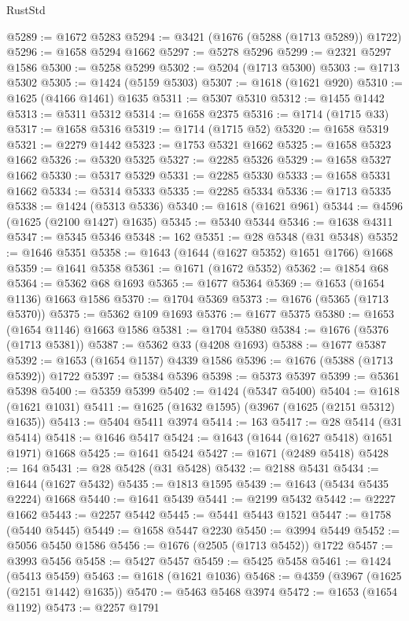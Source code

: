 \begin{lexlean}{RustStd}
\begin{coremodule}
@5289 := @1672 @5283
@5294 := @3421 (@1676 (@5288 (@1713 @5289)) @1722)
@5296 := @1658 @5294 @1662
@5297 := @5278 @5296
@5299 := @2321 @5297 @1586
@5300 := @5258 @5299
@5302 := @5204 (@1713 @5300)
@5303 := @1713 @5302
@5305 := @1424 (@5159 @5303)
@5307 := @1618 (@1621 @920)
@5310 := @1625 (@4166 @1461) @1635
@5311 := @5307 @5310
@5312 := @1455 @1442
@5313 := @5311 @5312
@5314 := @1658 @2375
@5316 := @1714 (@1715 @33)
@5317 := @1658 @5316
@5319 := @1714 (@1715 @52)
@5320 := @1658 @5319
@5321 := @2279 @1442
@5323 := @1753 @5321 @1662
@5325 := @1658 @5323 @1662
@5326 := @5320 @5325
@5327 := @2285 @5326
@5329 := @1658 @5327 @1662
@5330 := @5317 @5329
@5331 := @2285 @5330
@5333 := @1658 @5331 @1662
@5334 := @5314 @5333
@5335 := @2285 @5334
@5336 := @1713 @5335
@5338 := @1424 (@5313 @5336)
@5340 := @1618 (@1621 @961)
@5344 := @4596 (@1625 (@2100 @1427) @1635)
@5345 := @5340 @5344
@5346 := @1638 @4311
@5347 := @5345 @5346
@5348 := 162
@5351 := @28 @5348 (@31 @5348)
@5352 := @1646 @5351
@5358 := @1643 (@1644 (@1627 @5352) @1651 @1766) @1668
@5359 := @1641 @5358
@5361 := @1671 (@1672 @5352)
@5362 := @1854 @68
@5364 := @5362 @68 @1693
@5365 := @1677 @5364
@5369 := @1653 (@1654 @1136) @1663 @1586
@5370 := @1704 @5369
@5373 := @1676 (@5365 (@1713 @5370))
@5375 := @5362 @109 @1693
@5376 := @1677 @5375
@5380 := @1653 (@1654 @1146) @1663 @1586
@5381 := @1704 @5380
@5384 := @1676 (@5376 (@1713 @5381))
@5387 := @5362 @33 (@4208 @1693)
@5388 := @1677 @5387
@5392 := @1653 (@1654 @1157) @4339 @1586
@5396 := @1676 (@5388 (@1713 @5392)) @1722
@5397 := @5384 @5396
@5398 := @5373 @5397
@5399 := @5361 @5398
@5400 := @5359 @5399
@5402 := @1424 (@5347 @5400)
@5404 := @1618 (@1621 @1031)
@5411 := @1625 (@1632 @1595) (@3967 (@1625 (@2151 @5312) @1635))
@5413 := @5404 @5411 @3974
@5414 := 163
@5417 := @28 @5414 (@31 @5414)
@5418 := @1646 @5417
@5424 := @1643 (@1644 (@1627 @5418) @1651 @1971) @1668
@5425 := @1641 @5424
@5427 := @1671 (@2489 @5418)
@5428 := 164
@5431 := @28 @5428 (@31 @5428)
@5432 := @2188 @5431
@5434 := @1644 (@1627 @5432)
@5435 := @1813 @1595
@5439 := @1643 (@5434 @5435 @2224) @1668
@5440 := @1641 @5439
@5441 := @2199 @5432
@5442 := @2227 @1662
@5443 := @2257 @5442
@5445 := @5441 @5443 @1521
@5447 := @1758 (@5440 @5445)
@5449 := @1658 @5447 @2230
@5450 := @3994 @5449
@5452 := @5056 @5450 @1586
@5456 := @1676 (@2505 (@1713 @5452)) @1722
@5457 := @3993 @5456
@5458 := @5427 @5457
@5459 := @5425 @5458
@5461 := @1424 (@5413 @5459)
@5463 := @1618 (@1621 @1036)
@5468 := @4359 (@3967 (@1625 (@2151 @1442) @1635))
@5470 := @5463 @5468 @3974
@5472 := @1653 (@1654 @1192)
@5473 := @2257 @1791

\end{coremodule}
\end{lexlean}
